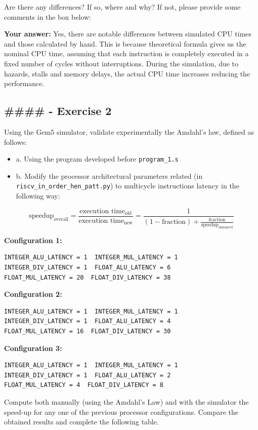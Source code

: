 \documentclass[11pt, a4paper]{article}
\begin{document}
Are there any differences? If so, where and why? If not, please provide some comments in the box below:

\textbf{Your answer:} Yes, there are notable differences between simulated CPU times and those calculated by hand. This is because theoretical formula gives us the nominal CPU time, assuming that each instruction is completely executed in a fixed number of cycles without interruptions. During the simulation, due to hazards, stalls and memory delays, the actual CPU time increases reducing the performance.

\newpage
\color{MyBlue}
\subsection*{\#\#\#\# - Exercise 2}
\color{black}
Using the Gem5 simulator, validate experimentally the Amdahl’s law, defined as follows:
\begin{itemize}
    \item a. Using the program developed before \texttt{program\_1.s}
    \item b. Modify the processor architectural parameters related (in \texttt{riscv\_in\_order\_hen\_patt.py}) to multicycle instructions latency in the following way:
\end{itemize}
\[
\text{speedup}_{\text{overall}} = \frac{\text{execution time}_{\text{old}}}{\text{execution time}_{\text{new}}} = \frac{1}{(1 - \text{fraction}) + \frac{\text{fraction}}{\text{speedup}_{\text{enhanced}}}}
\]

\textbf{Configuration 1:}
\begin{verbatim}
INTEGER_ALU_LATENCY = 1  INTEGER_MUL_LATENCY = 1
INTEGER_DIV_LATENCY = 1  FLOAT_ALU_LATENCY = 6
FLOAT_MUL_LATENCY = 20  FLOAT_DIV_LATENCY = 38
\end{verbatim}

\textbf{Configuration 2:}
\begin{verbatim}
INTEGER_ALU_LATENCY = 1  INTEGER_MUL_LATENCY = 1
INTEGER_DIV_LATENCY = 1  FLOAT_ALU_LATENCY = 4
FLOAT_MUL_LATENCY = 16  FLOAT_DIV_LATENCY = 30
\end{verbatim}

\textbf{Configuration 3:}
\begin{verbatim}
INTEGER_ALU_LATENCY = 1  INTEGER_MUL_LATENCY = 1
INTEGER_DIV_LATENCY = 1  FLOAT_ALU_LATENCY = 2
FLOAT_MUL_LATENCY = 4  FLOAT_DIV_LATENCY = 8
\end{verbatim}

Compute both manually (using the Amdahl’s Law) and with the simulator the speed-up for any one of the previous processor configurations. Compare the obtained results and complete the following table.
\end{document}
